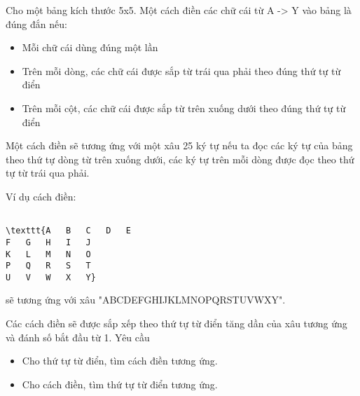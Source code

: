 Cho một bảng kích thước 5x5. Một cách điền các chữ cái từ A -> Y vào bảng là đúng đắn nếu:
\begin{itemize}
	\item Mỗi chữ cái dùng đúng một lần
	\item Trên mỗi dòng, các chữ cái được sắp từ trái qua phải theo đúng thứ tự từ điển
	\item Trên mỗi cột, các chữ cái được sắp từ trên xuống dưới theo đúng thứ tự từ điển
\end{itemize}

Một cách điền sẽ tương ứng với một xâu 25 ký tự nếu ta đọc các ký tự của bảng theo thứ tự dòng từ trên xuống dưới, các ký tự trên mỗi dòng được đọc theo thứ tự từ trái qua phải.

Ví dụ cách điền:
\begin{verbatim}

\texttt{A	B	C	D	E
F	G	H	I	J
K	L	M	N	O
P	Q	R	S	T
U	V	W	X	Y}\end{verbatim}

sẽ tương ứng với xâu "ABCDEFGHIJKLMNOPQRSTUVWXY".

Các cách điền sẽ được sắp xếp theo thứ tự từ điển tăng dần của xâu tương ứng và đánh số bắt đầu từ 1.
Yêu cầu
\begin{itemize}
	\item Cho thứ tự từ điển, tìm cách điền tương ứng.
	\item Cho cách điền, tìm thứ tự từ điển tương ứng.
\end{itemize}